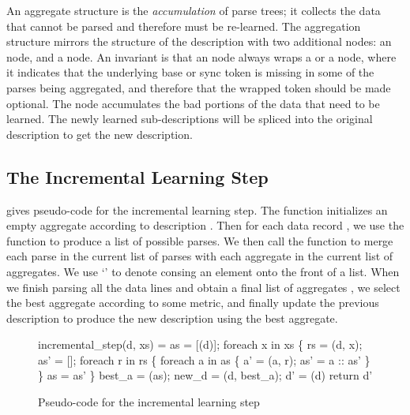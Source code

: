 An aggregate structure is the {\em accumulation} of parse trees; it
collects the data that cannot be parsed and therefore must be re-learned.
The aggregation structure mirrors the structure of the description  
with two additional nodes: an  node, and a  node. 
An invariant is that an  node always wraps a  or a  node,
where it indicates that the underlying base or sync token is missing
in some of the parses being aggregated, and therefore that the wrapped
token should be made optional. 
The  node accumulates the bad portions of the data that need
to be learned. The newly learned sub-descriptions 
will be spliced into the original description to get the new description. 

\subsection{The Incremental Learning Step}

 gives pseudo-code for the incremental
learning step.
The  function initializes an empty aggregate
according to description .  
Then for each data record , we use the  function to
produce a list  of possible parses.
We then call the  function to merge
each parse  in the current list of parses with each aggregate  in the
current list of aggregates. We use `\cd{::}' to denote 
consing an element onto the front of a list. 
When we finish
parsing all the data lines and obtain a final list of aggregates , we select
the best aggregate according to some metric, and finally update the previous description
 to produce the new description  using the best
aggregate. 

\begin{figure}[t]
\begin{codebox}
incremental_step(d, xs) =
  as = [(d)];
  foreach x in xs \{
    rs = (d, x);
    as' = [];
    foreach r in rs \{
      foreach a in as \{
        a' = (a, r); 
        as' = a :: as'
      \}
    \}
    as = as'
  \} 
  best_a = (as);
  new_d = (d, best_a);  
  d' = (d)
  return d'
\end{codebox}
\caption{Pseudo-code for the incremental learning step}
\label{fig:inc-learning}
\end{figure}

